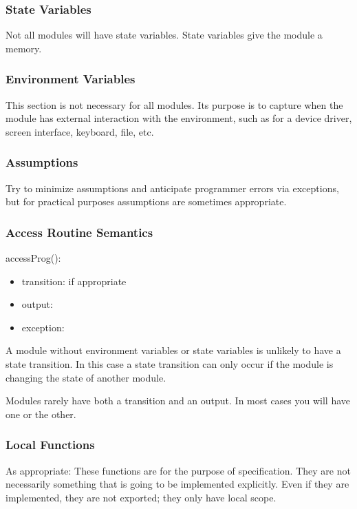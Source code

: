 \documentclass[12pt, titlepage]{article}
\begin{document}
\subsubsection{State Variables}

Not all modules will have state variables.  State variables give the module
  a memory.

\subsubsection{Environment Variables}

This section is not necessary for all modules.  Its purpose is to capture
  when the module has external interaction with the environment, such as for a
  device driver, screen interface, keyboard, file, etc.

\subsubsection{Assumptions}

Try to minimize assumptions and anticipate programmer errors via
  exceptions, but for practical purposes assumptions are sometimes appropriate.

\subsubsection{Access Routine Semantics}

\noindent accessProg():
\begin{itemize}
\item transition: if appropriate
\item output: 
\item exception:  
\end{itemize}

A module without environment variables or state variables is unlikely to
  have a state transition.  In this case a state transition can only occur if
  the module is changing the state of another module.

Modules rarely have both a transition and an output.  In most cases you
  will have one or the other.

\subsubsection{Local Functions}

As appropriate: These functions are for the purpose of specification.
  They are not necessarily something that is going to be implemented
  explicitly.  Even if they are implemented, they are not exported; they only
  have local scope.
\end{document}
